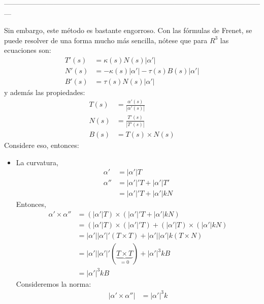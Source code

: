 \begin{problema}
\begin{sol}
\begin{itemize}
        ---------------------------------------------------------------------------------------------------------------

        Sin embargo, este método es bastante engorroso. Con las fórmulas de Frenet, se puede resolver de una forma mucho más sencilla, nótese que para $R^3$ las ecuaciones son: 
        \begin{align*}
            T'(s) &= \kappa(s)N(s)|\alpha'|\\
            N'(s) &= -\kappa(s)|\alpha'|-\tau(s)B(s)|\alpha'|\\
            B'(s) &= \tau(s)N(s)|\alpha'|
        \end{align*}
        y además las propiedades: 
        \begin{align*}
            T(s) &= \frac{\alpha'(s)}{|\alpha'(s)|}\\
            N(s) &= \frac{T'(s)}{|T'(s)|}\\
            B(s)&= T(s)\times N(s)
        \end{align*}
        Considere eso, entonces: 
        \begin{itemize}
            \item La curvatura, 
        \begin{align*}
            \alpha'&= |\alpha'|T\\
            \alpha'' &= |\alpha'|'T + |\alpha'|T'\\
                   &= |\alpha'|'T + |\alpha'|kN 
        \end{align*}
        Entonces, 
        \begin{align*}
            \alpha'\times \alpha'' &= \left(|\alpha'|T\right)\times \left(|\alpha'|'T + |\alpha'|kN \right)\\
            &=\left(|\alpha'|T\right)\times  \left(|\alpha'|'T \right)+
            \left(|\alpha'|T\right)\times  \left(|\alpha'|kN \right)\\
            &=|\alpha'||\alpha'|'\left(T\times T\right) +|\alpha'||\alpha'|k
            \left(T\times N \right)\\
            &=|\alpha'||\alpha'|'\left(\underbrace{T\times T}_{=0}\right) +|\alpha'|^3k
            B\\
            &= |\alpha'|^3k
            B
        \end{align*}
        Consideremos la norma: 
        \begin{align*}
            |\alpha'\times \alpha''| &= |\alpha'|^3k
        \end{align*}

\end{itemize}
\end{itemize}
\end{sol}
\end{problema}
